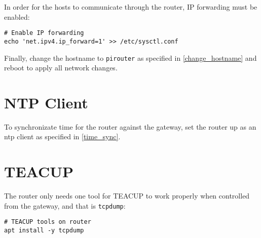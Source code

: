 In order for the hosts to communicate through the router, IP forwarding must be enabled:

\begin{lstlisting}
# Enable IP forwarding
echo 'net.ipv4.ip_forward=1' >> /etc/sysctl.conf
\end{lstlisting}

Finally, change the hostname to \lstinline{pirouter} as specified in \ref{change_hostname} and reboot to apply all network changes.


\section{NTP Client}

To synchronizate time for the router against the gateway, set the router up as an \gls{ntp} client as specified in \ref{time_sync}.


\section{TEACUP}

The router only needs one tool for TEACUP to work properly when controlled from the gateway, and that is \lstinline{tcpdump}:

\begin{lstlisting}
# TEACUP tools on router
apt install -y tcpdump
\end{lstlisting}